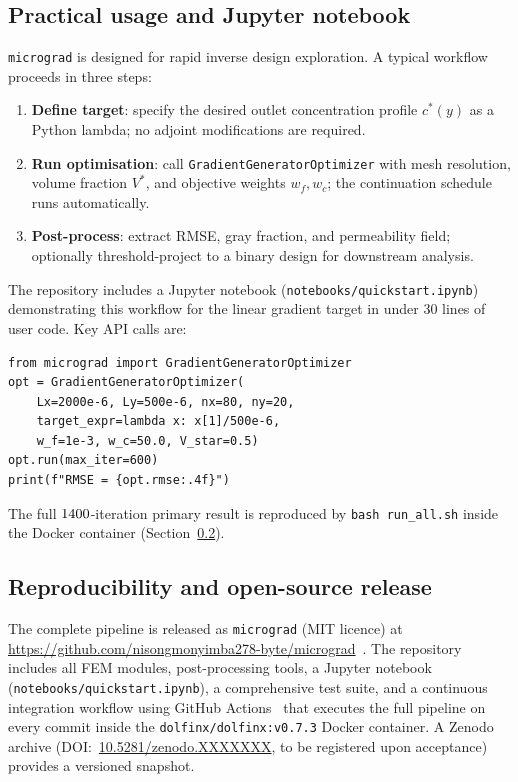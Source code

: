 \subsection{Practical usage and Jupyter notebook}
\label{sec:practical}
\texttt{micrograd} is designed for rapid inverse design exploration.
A typical workflow proceeds in three steps:
\begin{enumerate}\itemsep2pt
    \item \textbf{Define target}: specify the desired outlet
          concentration profile $c^*(y)$ as a Python lambda;
          no adjoint modifications are required.
    \item \textbf{Run optimisation}: call
          \texttt{GradientGeneratorOptimizer} with mesh resolution,
          volume fraction $V^*$, and objective weights $w_f, w_c$;
          the continuation schedule runs automatically.
    \item \textbf{Post-process}: extract RMSE, gray fraction,
          and permeability field; optionally threshold-project
          to a binary design for downstream analysis.
\end{enumerate}
The repository includes a Jupyter notebook
(\texttt{notebooks/quickstart.ipynb}) demonstrating this workflow
for the linear gradient target in under 30 lines of user code.
Key API calls are:
\begin{verbatim}
from micrograd import GradientGeneratorOptimizer
opt = GradientGeneratorOptimizer(
    Lx=2000e-6, Ly=500e-6, nx=80, ny=20,
    target_expr=lambda x: x[1]/500e-6,
    w_f=1e-3, w_c=50.0, V_star=0.5)
opt.run(max_iter=600)
print(f"RMSE = {opt.rmse:.4f}")
\end{verbatim}
The full $1400$-iteration primary result is reproduced by
\texttt{bash run\_all.sh} inside the Docker container
(Section~\ref{sec:reproducibility}).

\subsection{Reproducibility and open-source release}
\label{sec:reproducibility}
\label{sec:ci}
The complete pipeline is released as \texttt{micrograd} (MIT licence) at
\url{https://github.com/nisongmonyimba278-byte/micrograd}~\cite{micrograd2025zenodo}.
The repository includes all FEM modules, post-processing tools,
a Jupyter notebook (\texttt{notebooks/quickstart.ipynb}),
a comprehensive test suite, and a continuous integration workflow using GitHub Actions~\cite{GitHubActions2024}
that executes the full pipeline on every commit inside the
\texttt{dolfinx/dolfinx:v0.7.3} Docker container.
A Zenodo archive (DOI:~\href{https://doi.org/10.5281/zenodo.XXXXXXX}{10.5281/zenodo.XXXXXXX}, to be registered upon acceptance)
provides a versioned snapshot.

